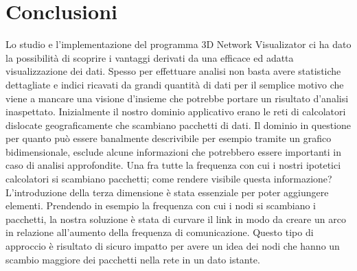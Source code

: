 \documentclass[a4paper,12pt]{article}
\begin{document}
\section{Conclusioni }
 
Lo studio e l'implementazione del programma 3D Network Visualizator ci ha dato la possibilità di scoprire i vantaggi derivati da una efficace ed adatta visualizzazione dei dati. Spesso per effettuare analisi non basta avere statistiche dettagliate e indici ricavati da grandi quantità di dati per il semplice motivo che viene a mancare una visione d'insieme che potrebbe portare un risultato d'analisi inaspettato.
Inizialmente il nostro dominio applicativo erano le reti di calcolatori dislocate geograficamente che scambiano pacchetti di dati. Il dominio in questione per quanto pu\`o essere banalmente descrivibile per esempio tramite un grafico bidimensionale, esclude alcune informazioni che potrebbero essere importanti in caso di analisi approfondite. Una fra tutte la frequenza con cui i nostri ipotetici calcolatori si scambiano pacchetti; come rendere visibile questa informazione? L'introduzione della terza dimensione \`e stata essenziale per poter aggiungere elementi. 
Prendendo in esempio la frequenza con cui i nodi si scambiano i pacchetti, la nostra soluzione \`e stata di curvare il link in modo da creare un arco in relazione all'aumento della frequenza di comunicazione. Questo tipo di approccio \`e risultato di sicuro impatto per avere un idea dei nodi che hanno un scambio maggiore dei pacchetti nella rete in un dato istante. 
\end{document}
